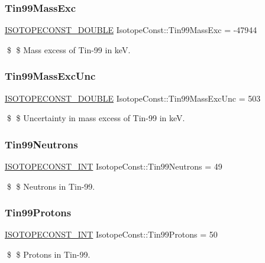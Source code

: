 \subsubsection{\texorpdfstring{Tin99\+Mass\+Exc}{Tin99MassExc}}
{\footnotesize\ttfamily \mbox{\hyperlink{group___isotope_const-_macros_ga8f45a7272ce02c0b4c65c44636ed719a}{I\+S\+O\+T\+O\+P\+E\+C\+O\+N\+S\+T\+\_\+\+D\+O\+U\+B\+LE}} Isotope\+Const\+::\+Tin99\+Mass\+Exc = -\/47944}

\$ \$ Mass excess of Tin-\/99 in keV. \mbox{\label{group___isotope_const-_tin-_sn99_ga21157eb8e99ecff4737350f8e7aa21f0}} 
\subsubsection{\texorpdfstring{Tin99\+Mass\+Exc\+Unc}{Tin99MassExcUnc}}
{\footnotesize\ttfamily \mbox{\hyperlink{group___isotope_const-_macros_ga8f45a7272ce02c0b4c65c44636ed719a}{I\+S\+O\+T\+O\+P\+E\+C\+O\+N\+S\+T\+\_\+\+D\+O\+U\+B\+LE}} Isotope\+Const\+::\+Tin99\+Mass\+Exc\+Unc = 503}

\$ \$ Uncertainty in mass excess of Tin-\/99 in keV. \mbox{\label{group___isotope_const-_tin-_sn99_ga939f630df23ae8f1b0af3985431ed4bb}} 
\subsubsection{\texorpdfstring{Tin99\+Neutrons}{Tin99Neutrons}}
{\footnotesize\ttfamily \mbox{\hyperlink{group___isotope_const-_macros_ga5f18360b3e99483a35c32d789e62621c}{I\+S\+O\+T\+O\+P\+E\+C\+O\+N\+S\+T\+\_\+\+I\+NT}} Isotope\+Const\+::\+Tin99\+Neutrons = 49}

\$ \$ Neutrons in Tin-\/99. \mbox{\label{group___isotope_const-_tin-_sn99_gadca318d838d5670e2ec63616dd6472b1}} 
\subsubsection{\texorpdfstring{Tin99\+Protons}{Tin99Protons}}
{\footnotesize\ttfamily \mbox{\hyperlink{group___isotope_const-_macros_ga5f18360b3e99483a35c32d789e62621c}{I\+S\+O\+T\+O\+P\+E\+C\+O\+N\+S\+T\+\_\+\+I\+NT}} Isotope\+Const\+::\+Tin99\+Protons = 50}

\$ \$ Protons in Tin-\/99. 